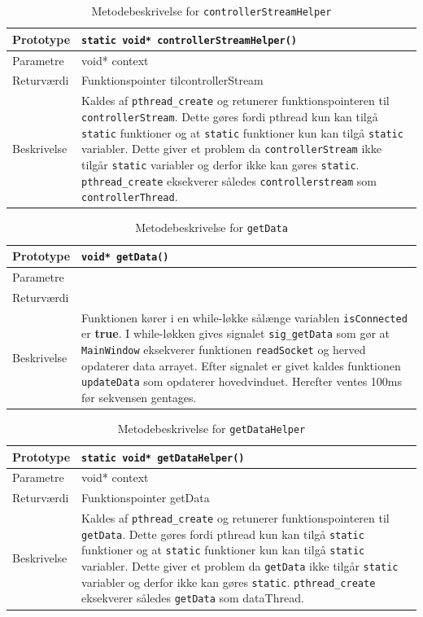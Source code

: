 \begin{table}[H]
\begin{tabularx}{\textwidth}{| l | Z |} \hline
Prototype & \texttt{static void* controllerStreamHelper()} \\\hline
Parametre & void* context  \\\hline
Returværdi & Funktionspointer tilcontrollerStream  \\\hline
Beskrivelse & Kaldes af \texttt{pthread\_create} og retunerer funktionspointeren til \texttt{controllerStream}. Dette gøres fordi pthread kun kan tilgå \texttt{static} funktioner og at \texttt{static} funktioner kun kan tilgå \texttt{static} variabler. Dette giver et problem da \texttt{controllerStream} ikke tilgår \texttt{static} variabler og derfor ikke kan gøres \texttt{static}. \texttt{pthread\_create} eksekverer således \texttt{controllerstream} som \texttt{controllerThread}.\\\hline
\end{tabularx}
\caption{Metodebeskrivelse for \texttt{controllerStreamHelper}}
\label{table:met_controllerStreamHelper}
\end{table}

\begin{table}[H]
\begin{tabularx}{\textwidth}{| l | Z |} \hline
Prototype & \texttt{void* getData()} \\\hline
Parametre &   \\\hline
Returværdi &  \\\hline
Beskrivelse & Funktionen kører i en while-løkke sålænge variablen \texttt{isConnected} er \textbf{true}. I while-løkken gives signalet \texttt{sig\_getData} som gør at \texttt{MainWindow} eksekverer funktionen \texttt{readSocket} og herved opdaterer data arrayet. Efter signalet er givet kaldes funktionen \texttt{updateData} som opdaterer hovedvinduet. Herefter ventes 100ms før sekvensen gentages.  \\\hline
\end{tabularx}
\caption{Metodebeskrivelse for \texttt{getData}}
\label{table:met_getData}
\end{table}

\begin{table}[H]
\begin{tabularx}{\textwidth}{| l | Z |} \hline
Prototype & \texttt{static void* getDataHelper()} \\\hline
Parametre & void* context  \\\hline
Returværdi & Funktionspointer getData  \\\hline
Beskrivelse & Kaldes af \texttt{pthread\_create} og retunerer funktionspointeren til \texttt{getData}. Dette gøres fordi pthread kun kan tilgå \texttt{static} funktioner og at \texttt{static} funktioner kun kan tilgå \texttt{static} variabler. Dette giver et problem da \texttt{getData} ikke tilgår \texttt{static} variabler og derfor ikke kan gøres \texttt{static}. \texttt{pthread\_create} eksekverer således \texttt{getData} som dataThread.\\\hline
\end{tabularx}
\caption{Metodebeskrivelse for \texttt{getDataHelper}}
\label{table:met_getDataHelper}
\end{table}

